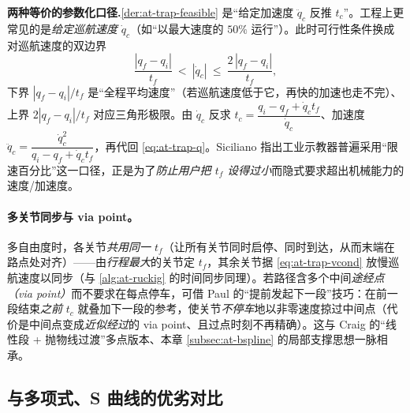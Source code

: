 \begin{note}
\textbf{两种等价的参数化口径.}\;\cref{der:at-trap-feasible} 是“给定加速度 $\ddot q_c$ 反推 $t_c$”。工程上更常见的是\emph{给定巡航速度} $\dot q_c$（如“以最大速度的 $50\%$ 运行”）。此时可行性条件换成对巡航速度的双边界
\begin{equation}
  \frac{|q_f-q_i|}{t_f}\ <\ |\dot q_c|\ \le\ \frac{2\,|q_f-q_i|}{t_f},
  \label{eq:at-trap-vcond}
\end{equation}
下界 $|q_f-q_i|/t_f$ 是“全程平均速度”（若巡航速度低于它，再快的加速也走不完）、上界 $2|q_f-q_i|/t_f$ 对应三角形极限。由 $\dot q_c$ 反求 $t_c=\dfrac{q_i-q_f+\dot q_c t_f}{\dot q_c}$、加速度 $\ddot q_c=\dfrac{\dot q_c^2}{q_i-q_f+\dot q_c t_f}$，再代回 \cref{eq:at-trap-q}。Siciliano 指出工业示教器普遍采用“限速百分比”这一口径，正是为了\emph{防止用户把 $t_f$ 设得过小}而隐式要求超出机械能力的速度/加速度\cite{siciliano2009robotics}。
\end{note}

\paragraph{多关节同步与 via point。}
多自由度时，各关节\emph{共用同一 $t_f$}（让所有关节同时启停、同时到达，从而末端在路点处对齐）——由\emph{行程最大}的关节定 $t_f$，其余关节据 \cref{eq:at-trap-vcond} 放慢巡航速度以同步（与 \cref{alg:at-ruckig} 的时间同步同理）。若路径含多个中间\emph{途经点（via point）}而不要求在每点停车，可借 Paul 的“提前发起下一段”技巧\cite{paul1981robot}：在前一段结束\emph{之前} $t_c$ 就叠加下一段的参考，使关节\emph{不停车}地以非零速度掠过中间点（代价是中间点变成\emph{近似经过}的 via point、且过点时刻不再精确）。这与 Craig 的“线性段 + 抛物线过渡”多点版本\cite{craig2005introduction}、本章 \cref{subsec:at-bspline} 的局部支撑思想一脉相承。

\subsection{与多项式、S 曲线的优劣对比}
\label{subsec:at-trap-cmp}

